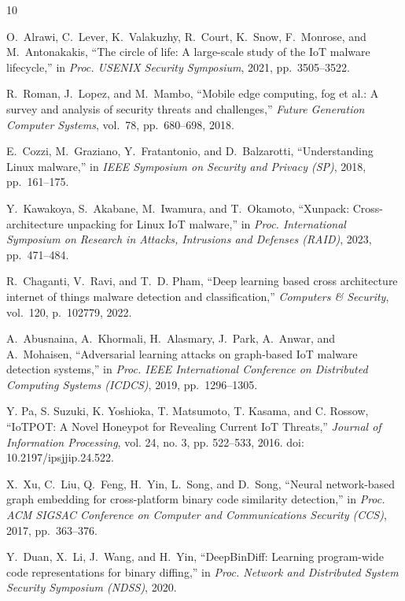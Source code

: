 \documentclass[conference]{IEEEtran}
\begin{document}
\vspace{-4pt}
\begin{thebibliography}{10}

O.~Alrawi, C.~Lever, K.~Valakuzhy, R.~Court, K.~Snow, F.~Monrose, and M.~Antonakakis, ``The circle of life: A large-scale study of the {IoT} malware lifecycle,'' in {\em Proc. USENIX Security Symposium}, 2021, pp.~3505--3522.

R.~Roman, J.~Lopez, and M.~Mambo, ``Mobile edge computing, fog et al.: A survey and analysis of security threats and challenges,'' {\em Future Generation Computer Systems}, vol.~78, pp.~680--698, 2018.

E.~Cozzi, M.~Graziano, Y.~Fratantonio, and D.~Balzarotti, ``Understanding {Linux} malware,'' in {\em IEEE Symposium on Security and Privacy (SP)}, 2018, pp.~161--175.

Y.~Kawakoya, S.~Akabane, M.~Iwamura, and T.~Okamoto, ``{Xunpack}: Cross-architecture unpacking for {Linux} {IoT} malware,'' in {\em Proc. International Symposium on Research in Attacks, Intrusions and Defenses (RAID)}, 2023, pp.~471--484.


R.~Chaganti, V.~Ravi, and T.~D. Pham, ``Deep learning based cross architecture internet of things malware detection and classification,'' {\em Computers \& Security}, vol.~120, p.~102779, 2022.

A.~Abusnaina, A.~Khormali, H.~Alasmary, J.~Park, A.~Anwar, and A.~Mohaisen, ``Adversarial learning attacks on graph-based {IoT} malware detection systems,'' in {\em Proc. IEEE International Conference on Distributed Computing Systems (ICDCS)}, 2019, pp.~1296--1305.


 Y. Pa, S. Suzuki, K. Yoshioka, T. Matsumoto, T. Kasama, and C. Rossow, ``IoTPOT: A Novel Honeypot for Revealing Current IoT Threats,'' \textit{Journal of Information Processing}, vol. 24, no. 3, pp. 522--533, 2016. doi: 10.2197/ipsjjip.24.522.

X.~Xu, C.~Liu, Q.~Feng, H.~Yin, L.~Song, and D.~Song, ``Neural network-based graph embedding for cross-platform binary code similarity detection,'' in {\em Proc. ACM SIGSAC Conference on Computer and Communications Security (CCS)}, 2017, pp.~363--376.

Y.~Duan, X.~Li, J.~Wang, and H.~Yin, ``{DeepBinDiff}: Learning program-wide code representations for binary diffing,'' in {\em Proc. Network and Distributed System Security Symposium (NDSS)}, 2020.


\end{thebibliography}
\end{document}
